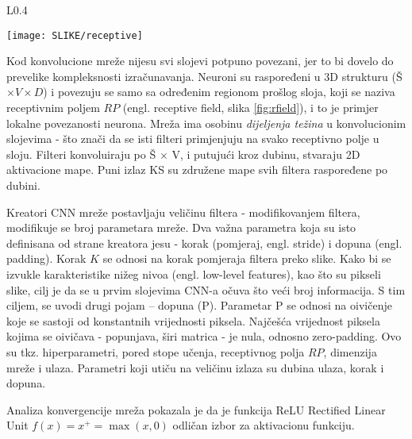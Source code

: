 \documentclass[12pt]{report}
\numberwithin{equation}{section}
\begin{document}
   \begin{wrapfigure}{L}{0.4\textwidth}
\vspace{-20pt}  
  \begin{center}
    \texttt{[image: SLIKE/receptive]}
  \end{center}
  \caption{(Plavi) neuroni KS povezani sa (crvenim) RP: veze putuju kroz dubinu}
  \label{fig:rfield}
\end{wrapfigure}


  Kod konvolucione mreže nijesu svi slojevi potpuno povezani, jer to bi dovelo do prevelike kompleksnosti izračunavanja. Neuroni su raspoređeni u 3D strukturu (Š $\times V \times D$) i povezuju se samo sa određenim regionom prošlog sloja, koji se naziva receptivnim poljem $RP$ (engl. receptive field, slika \ref{fig:rfield}), i to je primjer lokalne povezanosti neurona. Mreža ima osobinu \textit{dijeljenja težina} u konvolucionim slojevima - što znači da se isti filteri primjenjuju na svako receptivno polje u sloju. Filteri konvoluiraju po Š $\times$ V, i putujući kroz dubinu, stvaraju 2D aktivacione mape. Puni izlaz KS su združene mape svih filtera raspoređene po dubini. 

  Kreatori CNN mreže postavljaju veličinu filtera - modifikovanjem filtera, modifikuje se broj parametara mreže. Dva važna parametra koja su isto definisana od strane kreatora jesu - korak (pomjeraj, engl. stride) i dopuna (engl. padding). Korak $K$ se odnosi na korak pomjeraja filtera  preko  slike. Kako bi se izvukle karakteristike nižeg nivoa (engl. low-level  features), kao što su pikseli slike, cilj je da se u prvim  slojevima CNN-a očuva što veći broj informacija. S tim ciljem, se uvodi drugi pojam – dopuna (P). Parametar P se odnosi na oivičenje koje se sastoji od konstantnih vrijednosti piksela. Najčešća vrijednost piksela kojima se oivičava - popunjava, širi matrica - je nula, odnosno zero-padding. Ovo su tkz. hiperparametri, pored stope učenja, receptivnog polja $RP$, dimenzija mreže i ulaza. Parametri koji utiču na veličinu izlaza su dubina ulaza, korak i dopuna. 
  
\newpage  
  
  Analiza konvergencije mreža pokazala je da je funkcija ReLU Rectified Linear Unit $f(x)=x^{+}=\max(x,0)$ odličan izbor za aktivacionu funkciju.
  
   
 
\end{document}
